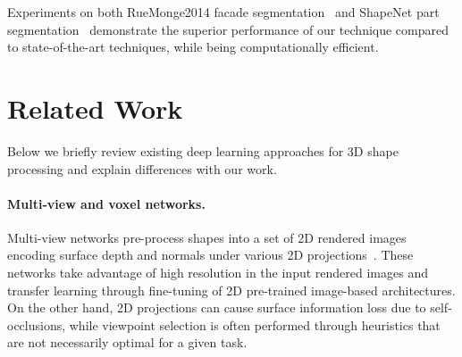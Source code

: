 \documentclass[10pt,twocolumn,letterpaper]{article}
\begin{document}
Experiments on both RueMonge2014 facade segmentation~\cite{riemenschneider2014learning} and ShapeNet part segmentation~\cite{yi2016scalable} 
demonstrate the superior performance of our technique compared to state-of-the-art techniques, 
while being computationally efficient.

\section{Related Work}\label{sec:related}

Below we briefly review existing deep learning approaches for 3D shape processing and explain differences with our work.

\vspace{-0.35cm}\paragraph{Multi-view and voxel networks.} Multi-view networks pre-process shapes into a set of 2D rendered images encoding surface depth and normals under various 2D projections~\cite{su15mvcnn,qi2016volmv,bai2016gift,kalogerakis2017shapepfcn,cao2017sphericalprojection,huang2018lmvcnn}. These networks take advantage of high resolution in the input rendered images and transfer learning through fine-tuning of 2D pre-trained image-based architectures. On the other hand, 2D projections can cause surface information loss due to self-occlusions, while viewpoint selection is often performed through heuristics that are not necessarily optimal for a given task.
\end{document}
